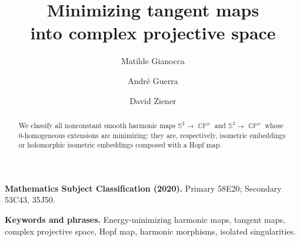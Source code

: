 \documentclass[11pt]{article}
\theoremstyle{plain}
\numberwithin{equation}{section}
\theoremstyle{definition}
\def \mb{\mathbb}
\DeclareMathOperator{\CP}{\mathbb{CP}}
\begin{document}
	\title{\textbf{Minimizing tangent maps\\ into complex projective space}}
		
		
	\author[1]{{\Large Matilde Gianocca}}
    \author[2,3]{{\Large Andr\'e Guerra}}
    \author[4]{{\Large David Ziener}}


    \date{}
	\maketitle
		
	\begin{abstract}
	We classify all nonconstant smooth harmonic maps $\mb S^2\to \CP^n$ and $\mb S^3\to \CP^n$ whose 0-homogeneous extensions are minimizing: they are, respectively, isometric embeddings or holomorphic isometric embeddings composed with a Hopf map.
	\end{abstract}

    \medskip

    \noindent\textbf{Mathematics Subject Classification (2020).} Primary 58E20; Secondary 53C43, 35J50.

    \smallskip

    \noindent\textbf{Keywords and phrases.}
    Energy-minimizing harmonic maps, tangent maps, complex projective space, Hopf map, harmonic morphisms, isolated singularities.
\end{document}
